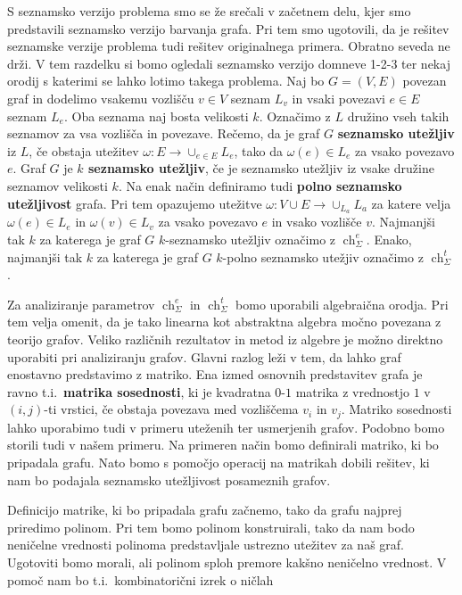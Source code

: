 \documentclass[12pt,a4paper,twoside]{article}
\theoremstyle{definition} %
\theoremstyle{plain} %
\newcommand{\ecl}{\ch_{\Sigma}^e}
\newcommand{\eclt}{\ch_{\Sigma}^t}
\numberwithin{equation}{section}  %
\DeclareMathOperator{\ch}{ch}
\begin{document}
S seznamsko verzijo problema smo se že srečali v začetnem delu, kjer smo predstavili seznamsko verzijo barvanja grafa. Pri tem smo ugotovili, da je rešitev seznamske verzije problema tudi rešitev originalnega primera. Obratno seveda ne drži. V tem razdelku si bomo ogledali seznamsko verzijo domneve 1-2-3  ter nekaj orodij s katerimi se lahko lotimo takega problema. Naj bo $G = (V, E)$ povezan graf in dodelimo vsakemu vozlišču $v \in V$ seznam $L_v$ in vsaki povezavi $e \in E$ seznam  $L_e$. Oba seznama naj bosta velikosti $k$. Označimo z $L$ družino vseh takih seznamov za vsa vozlišča in povezave. Rečemo, da je graf $G$ \textbf{seznamsko utežljiv} iz $L$, če obstaja utežitev $\omega : E \rightarrow \cup_{e \in E} L_e$, tako da $\omega(e) \in L_e$ za vsako povezavo $e$. Graf $G$ je  \textbf{$k$ seznamsko utežljiv}, če je seznamsko utežljiv iz vsake družine seznamov velikosti $k$. Na enak način definiramo tudi \textbf{polno seznamsko utežljivost} grafa. Pri tem opazujemo utežitve $\omega : V \cup E \rightarrow \cup_{L_a} L_a$ za katere velja $\omega(e) \in L_e$ in $\omega(v) \in L_v$ za vsako povezavo $e$ in vsako vozlišče $v$. Najmanjši tak $k$ za katerega je graf $G$ $k$-seznamsko utežljiv označimo z $\ecl$. Enako, najmanjši tak $k$ za katerega je graf $G$ $k$-polno seznamsko utežjiv označimo z $\eclt$.

Za analiziranje parametrov $\ecl$ in $\eclt$ bomo uporabili algebraična orodja. Pri tem velja omenit, da je tako linearna kot abstraktna algebra močno povezana z teorijo grafov. Veliko različnih rezultatov in metod iz algebre je možno direktno uporabiti pri analiziranju grafov. Glavni razlog leži v tem, da lahko graf enostavno predstavimo z matriko. Ena izmed osnovnih predstavitev grafa je ravno t.i.\ \textbf{matrika sosednosti}, ki je kvadratna $0$-$1$ matrika z vrednostjo $1$ v $(i,j)$-ti vrstici, če obstaja povezava med vozliščema $v_i$ in $v_j$. Matriko sosednosti lahko uporabimo tudi v primeru uteženih ter usmerjenih grafov. Podobno bomo storili tudi v našem primeru. Na primeren način bomo definirali matriko, ki bo pripadala grafu. Nato bomo s pomočjo operacij na matrikah dobili rešitev, ki nam bo podajala seznamsko utežljivost posameznih grafov.

Definicijo matrike, ki bo pripadala grafu začnemo, tako da grafu najprej priredimo polinom. Pri tem bomo polinom konstruirali, tako da nam bodo neničelne vrednosti polinoma predstavljale ustrezno utežitev za naš graf. Ugotoviti bomo morali, ali polinom sploh premore kakšno neničelno vrednost. V pomoč nam bo t.i.\ kombinatorični izrek o ničlah
\end{document}
